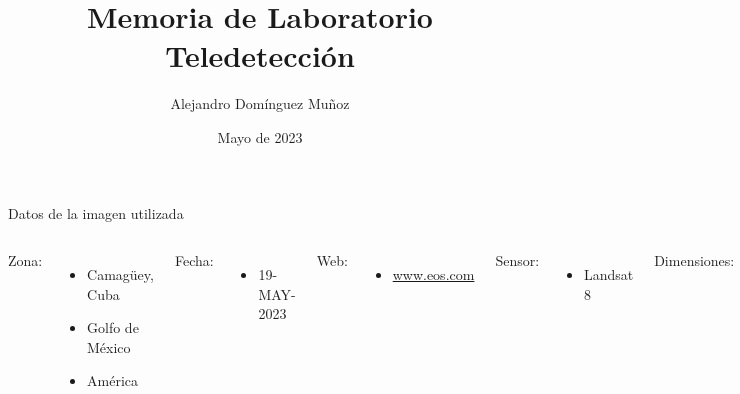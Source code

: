 \documentclass{beamer}
\title{
    Memoria de Laboratorio \\
    \large Teledetección
}
\author{Alejandro Domínguez Muñoz}
\institute{Universidad de Sevilla}
\date{Mayo de 2023}
\begin{document}
\frame{\titlepage}

\begin{frame}{Datos de la imagen utilizada}
\begin{columns}

Zona:
\begin{itemize}
\item Camagüey, Cuba
\item Golfo de México
\item América
\end{itemize}

Fecha:
\begin{itemize}
\item 19-MAY-2023
\end{itemize}

Web:
\begin{itemize}
\item \url{www.eos.com}
\end{itemize}

Sensor:
\begin{itemize}
\item Landsat 8
\end{itemize}


Dimensiones:
\begin{itemize}
\item 7784 filas
\item 7741 columnas
\end{itemize}

Resolución radiométrica:
\begin{itemize}
\item 16 bits
\end{itemize}

Resolución espacial:
\begin{itemize}
\item 30 m
\end{itemize}

Bandas:
\begin{itemize}
\item 2/BLUE
\item 3/GREEN
\item 4/RED
\item 5/NIR
\item 6/SWIR1
\end{itemize}

\end{columns}
\end{frame}
\end{document}
